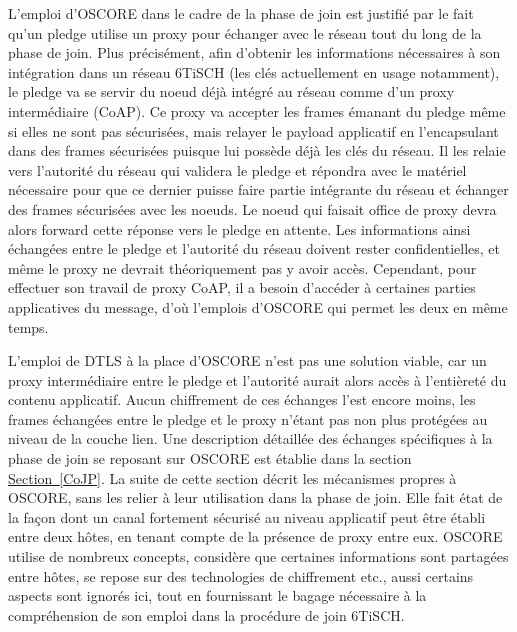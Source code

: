 \documentclass[]{report}
\newcommand{\wordlink}[2]{\hyperref[#2]{#1~\ref{#2}}}
\begin{document}
\par L'emploi d'OSCORE dans le cadre de la phase de join est justifié par le fait qu'un pledge utilise un proxy pour échanger avec le réseau tout du long de la phase de join. Plus précisément, afin d'obtenir les informations nécessaires à son intégration dans un réseau 6TiSCH (les clés actuellement en usage notamment), le pledge va se servir du noeud déjà intégré au réseau comme d'un proxy intermédiaire (CoAP). Ce proxy va accepter les frames émanant du pledge même si elles ne sont pas sécurisées, mais relayer le payload applicatif en l'encapsulant dans des frames sécurisées puisque lui possède déjà les clés du réseau. Il les relaie vers l'autorité du réseau qui validera le pledge et répondra avec le matériel nécessaire pour que ce dernier puisse faire partie intégrante du réseau et échanger des frames sécurisées avec les noeuds. Le noeud qui faisait office de proxy devra alors forward cette réponse vers le pledge en attente. Les informations ainsi échangées entre le pledge et l'autorité du réseau doivent rester confidentielles, et même le proxy ne devrait théoriquement pas y avoir accès. Cependant, pour effectuer son travail de proxy CoAP, il a besoin d'accéder à certaines parties applicatives du message, d'où l'emplois d'OSCORE qui permet les deux en même temps.\\

\par L'emploi de DTLS à la place d'OSCORE n'est pas une solution viable, car un proxy intermédiaire entre le pledge et l'autorité aurait alors accès à l'entièreté du contenu applicatif. Aucun chiffrement de ces échanges l'est encore moins, les frames échangées entre le pledge et le proxy n'étant pas non plus protégées au niveau de la couche lien. Une description détaillée des échanges spécifiques à la phase de join se reposant sur OSCORE est établie dans la section \wordlink{Section}{CoJP}. La suite de cette section décrit les mécanismes propres à OSCORE, sans les relier à leur utilisation dans la phase de join. Elle fait état de la façon dont un canal fortement sécurisé au niveau applicatif peut être établi entre deux hôtes, en tenant compte de la présence de proxy entre eux. OSCORE utilise de nombreux concepts, considère que certaines informations sont partagées entre hôtes, se repose sur des technologies de chiffrement etc., aussi certains aspects sont ignorés ici, tout en fournissant le bagage nécessaire à la compréhension de son emploi dans la procédure de join 6TiSCH.\\
\end{document}

